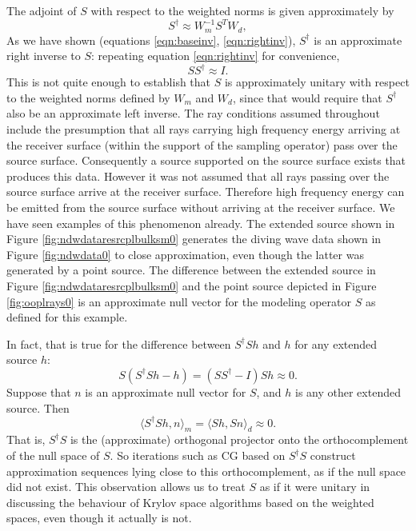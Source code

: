 \documentclass[12pt]{geophysics}
\begin{document}
The adjoint of $S$ with respect to the weighted norms is given
approximately by
\begin{equation}
\label{eqn:wadj}
S^{\dagger} \approx  W_m^{-1}S^TW_d,
\end{equation}
As we have shown (equations \ref{eqn:baseinv}, \ref{eqn:rightinv}),
$S^{\dagger}$ is an approximate right inverse to $S$: repeating
equation \ref{eqn:rightinv} for convenience,
\begin{equation}
  \label{eqn:wunitary}
  SS^{\dagger} \approx I.
\end{equation}
This is not quite enough to establish that
$S$ is approximately unitary with respect to the
weighted norms defined by $W_m$ and $W_d$, since that would require
that $S^{\dagger}$ also be an approximate left inverse. The ray
conditions assumed throughout include the presumption that all rays
carrying high frequency energy arriving at the receiver surface
(within the support of the sampling operator) pass
over the source surface. Consequently a source supported on the source
surface exists that produces this data. However it was not assumed
that all rays passing over the source surface arrive at the receiver
surface. Therefore high frequency energy can be emitted from the
source surface without arriving at the receiver surface. We have seen
examples of this phenomenon already. The extended source shown in Figure
\ref{fig:ndwdataresrcplbulksm0} generates the diving wave data shown
in Figure \ref{fig:ndwdata0} to close approximation, even though the
latter was generated by a point source. The difference between the
extended source in Figure \ref{fig:ndwdataresrcplbulksm0} and the
point source depicted in Figure \ref{fig:ooplrays0} is an approximate
null vector for the modeling operator $S$ as defined for this
example.

In fact, that is true for the difference between $S^{\dagger}Sh$ and
$h$ for any extended source $h$:
\[
  S(S^{\dagger}Sh - h) = (SS^{\dagger}-I)Sh \approx 0.
\]
Suppose that $n$ is an approximate null vector for $S$, and $h$ is any
other extended source. Then
\[
  \langle S^{\dagger}S h, n \rangle_m = \langle Sh, Sn \rangle_d
  \approx 0.
\]
That is, $S^{\dagger}S$ is the (approximate) orthogonal projector onto
the orthocomplement of the null space of $S$. So iterations such as CG
based on $S^{\dagger}S$ construct approximation sequences lying close
to this orthocomplement, as if the null space did not exist. This
observation allows us to treat $S$ as if it were unitary in discussing
the behaviour of Krylov space algorithms based on the weighted spaces,
even though it actually is not.
\end{document}
